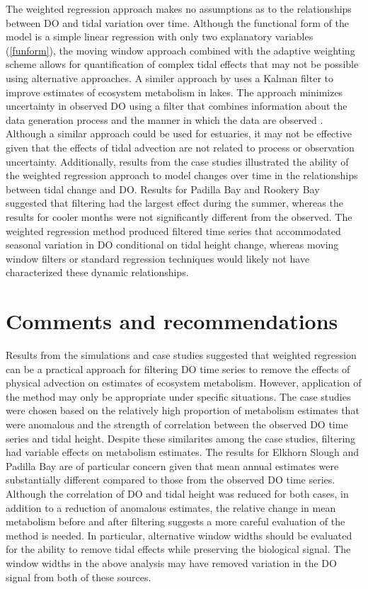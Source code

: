 \documentclass[letterpaper,12pt,oneside]{article}\usepackage[]{graphicx}\usepackage[]{color}
\begin{document}
The weighted regression approach makes no assumptions as to the relationships between \ac{DO} and tidal variation over time.  Although the functional form of the model is a simple linear regression with only two explanatory variables (\cref{funform}), the moving window approach combined with the adaptive weighting scheme allows for quantification of complex tidal effects that may not be possible using alternative approaches.  A similer approach by \citet{Batt12} uses a Kalman filter to improve estimates of ecosystem metabolism in lakes.  The approach minimizes uncertainty in observed \ac{DO} using a filter that combines information about the data generation process and the manner in which the data are observed \citep{Harvey89}.  Although a similar approach could be used for estuaries, it may not be effective given that the effects of tidal advection are not related to process or observation uncertainty.  Additionally, results from the case studies illustrated the ability of the weighted regression approach to model changes over time in the relationships between tidal change and \ac{DO}.  Results for Padilla Bay and Rookery Bay suggested that filtering had the largest effect during the summer, whereas the results for cooler months were not significantly different from the observed.  The weighted regression method produced filtered time series that accommodated seasonal variation in \ac{DO} conditional on tidal height change, whereas moving window filters or standard regression techniques would likely not have characterized these dynamic relationships.

\section{Comments and recommendations}

Results from the simulations and case studies suggested that weighted regression can be a practical approach for filtering \ac{DO} time series to remove the effects of physical advection on estimates of ecosystem metabolism.  However, application of the method may only be appropriate under specific situations.  The case studies were chosen based on the relatively high proportion of metabolism estimates that were anomalous and the strength of correlation between the observed \ac{DO} time series and tidal height.  Despite these similarites among the case studies, filtering had variable effects on metabolism estimates.  The results for Elkhorn Slough and Padilla Bay are of particular concern given that mean annual estimates were substantially different compared to those from the observed \ac{DO} time series.  Although the correlation of \ac{DO} and tidal height was reduced for both cases, in addition to a reduction of anomalous estimates, the relative change in mean metabolism before and after filtering suggests a more careful evaluation of the method is needed.  In particular, alternative window widths should be evaluated for the ability to remove tidal effects while preserving the biological signal.  The window widths in the above analysis may have removed variation in the \ac{DO} signal from both of these sources.    
\end{document}
